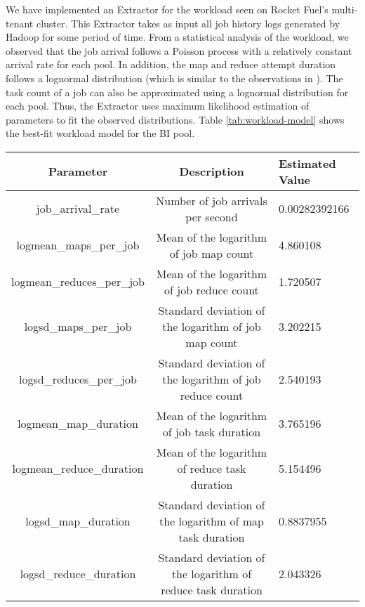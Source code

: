 We have implemented an Extractor for the workload 
seen on Rocket Fuel's multi-tenant cluster. This Extractor
takes as input all job history logs generated
by Hadoop for some period of time. From a statistical analysis
of the workload, we observed that the job
arrival follows a Poisson process with a relatively constant
arrival rate for each pool. In addition, the map and reduce attempt
duration follows a lognormal distribution (which is similar
to the observations in \cite{taobao-paper}). 
The task count of a job can also be approximated using a lognormal
distribution for each pool. Thus, the Extractor uses 
maximum likelihood estimation of parameters to fit 
the observed distributions. Table \ref{tab:workload-model}
shows the best-fit workload model for the BI pool.

\begin{table*}
  \centering
  \caption{Workload model of analyst pool (Time is in seconds)}
  \begin{tabular}{|c|c|l|} \hline
    Parameter&Description&Estimated Value\\ \hline
    job\_arrival\_rate & Number of job arrivals per second &
    0.00282392166\\ \hline
    logmean\_maps\_per\_job & Mean of the logarithm of job map count & 4.860108\\ \hline
    logmean\_reduces\_per\_job & Mean of the logarithm of job reduce count & 1.720507\\ \hline
    logsd\_maps\_per\_job & Standard deviation of the logarithm of job map count & 3.202215\\ \hline
    logsd\_reduces\_per\_job & Standard deviation of the logarithm of job reduce count & 2.540193\\ \hline
    logmean\_map\_duration & Mean of the logarithm of job task duration & 3.765196\\ \hline
    logmean\_reduce\_duration & Mean of the logarithm of reduce task duration & 5.154496\\ \hline
    logsd\_map\_duration & Standard deviation of the logarithm of map task duration & 0.8837955\\ \hline
    logsd\_reduce\_duration & Standard deviation of the logarithm of reduce task duration & 2.043326\\ \hline
\end{tabular}
\label{tab:workload-model}
\end{table*}

